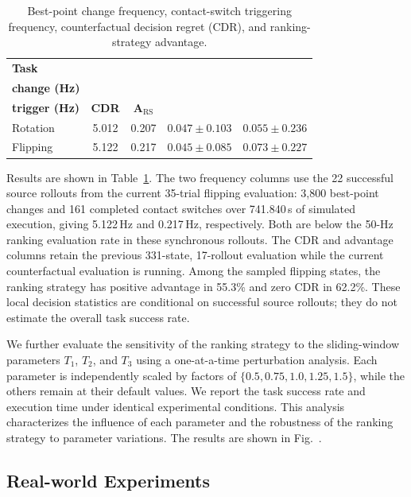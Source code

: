 \begin{table}[t]
\centering
\caption{Best-point change frequency, contact-switch triggering frequency, counterfactual decision regret (CDR), and ranking-strategy advantage.}
\label{tab:ranking_frequency_cdr}
\footnotesize
\setlength{\tabcolsep}{2pt}
\begin{tabular*}{\columnwidth}{@{\extracolsep{\fill}} lcccc}
\toprule
\textbf{Task} & \shortstack{\textbf{Best-point}\\\textbf{change (Hz)}} & \shortstack{\textbf{Contact-switch}\\\textbf{trigger (Hz)}} & \textbf{CDR} & $\boldsymbol{A_{\mathrm{RS}}}$ \\
\midrule
Rotation & 5.012 & 0.207 & $0.047 \pm 0.103$ & $0.055 \pm 0.236$ \\
Flipping & 5.122 & 0.217 & $0.045 \pm 0.085$ & $0.073 \pm 0.227$ \\
\bottomrule
\end{tabular*}
\end{table}

Results are shown in Table~\ref{tab:ranking_frequency_cdr}. The two frequency columns use the 22 successful source rollouts from the current 35-trial flipping evaluation: 3,800 best-point changes and 161 completed contact switches over 741.840\,s of simulated execution, giving 5.122\,Hz and 0.217\,Hz, respectively. Both are below the 50-Hz ranking evaluation rate in these synchronous rollouts. The CDR and advantage columns retain the previous 331-state, 17-rollout evaluation while the current counterfactual evaluation is running. Among the sampled flipping states, the ranking strategy has positive advantage in 55.3\% and zero CDR in 62.2\%. These local decision statistics are conditional on successful source rollouts; they do not estimate the overall task success rate.

We further evaluate the sensitivity of the ranking strategy to the sliding-window parameters $T_1$, $T_2$, and $T_3$ using a one-at-a-time perturbation analysis. Each parameter is independently scaled by factors of $\{0.5,0.75,1.0,1.25,1.5\}$, while the others remain at their default values. We report the task success rate and execution time under identical experimental conditions. This analysis characterizes the influence of each parameter and the robustness of the ranking strategy to parameter variations. The results are shown in Fig.~.

\subsection{Real-world Experiments}

